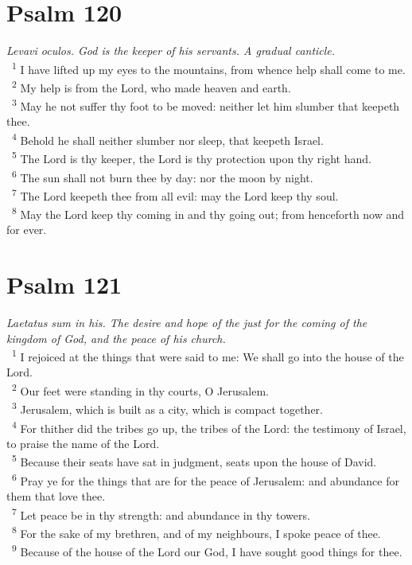 \documentclass[a5paper,12pt]{article}
\begin{document}
\begin{multicols*}{2}
\section{Psalm 120}
\label{sec:orga726524}
\emph{Levavi oculos. God is the keeper of his servants. A gradual canticle.}\\

~\textsuperscript{1} I have lifted up my eyes to the mountains, from whence help shall come to me.\\
~\textsuperscript{2} My help is from the Lord, who made heaven and earth.\\
~\textsuperscript{3} May he not suffer thy foot to be moved: neither let him slumber that keepeth thee.\\
~\textsuperscript{4} Behold he shall neither slumber nor sleep, that keepeth Israel.\\
~\textsuperscript{5} The Lord is thy keeper, the Lord is thy protection upon thy right hand.\\
~\textsuperscript{6} The sun shall not burn thee by day: nor the moon by night.\\
~\textsuperscript{7} The Lord keepeth thee from all evil: may the Lord keep thy soul.\\
~\textsuperscript{8} May the Lord keep thy coming in and thy going out; from henceforth now and for ever.\\

\section{Psalm 121}
\label{sec:org458054e}
\emph{Laetatus sum in his. The desire and hope of the just for the coming of the kingdom of God, and the peace of his church.}\\

~\textsuperscript{1} I rejoiced at the things that were said to me: We shall go into the house of the Lord.\\
~\textsuperscript{2} Our feet were standing in thy courts, O Jerusalem.\\
~\textsuperscript{3} Jerusalem, which is built as a city, which is compact together.\\
~\textsuperscript{4} For thither did the tribes go up, the tribes of the Lord: the testimony of Israel, to praise the name of the Lord.\\
~\textsuperscript{5} Because their seats have sat in judgment, seats upon the house of David.\\
~\textsuperscript{6} Pray ye for the things that are for the peace of Jerusalem: and abundance for them that love thee.\\
~\textsuperscript{7} Let peace be in thy strength: and abundance in thy towers.\\
~\textsuperscript{8} For the sake of my brethren, and of my neighbours, I spoke peace of thee.\\
~\textsuperscript{9} Because of the house of the Lord our God, I have sought good things for thee.\\


\end{multicols*}
\end{document}
